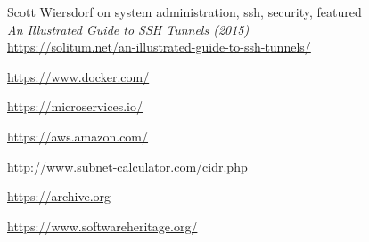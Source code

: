 \begin{thebibliography}{9}
  Scott Wiersdorf on system administration, ssh, security, featured \\
  \textit{An Illustrated Guide to SSH Tunnels (2015)} \\
  \url{https://solitum.net/an-illustrated-guide-to-ssh-tunnels/}

\url{https://www.docker.com/}

\url{https://microservices.io/}

\url{https://aws.amazon.com/}

\url{http://www.subnet-calculator.com/cidr.php}

\url{https://archive.org}

\url{https://www.softwareheritage.org/}
\end{thebibliography}